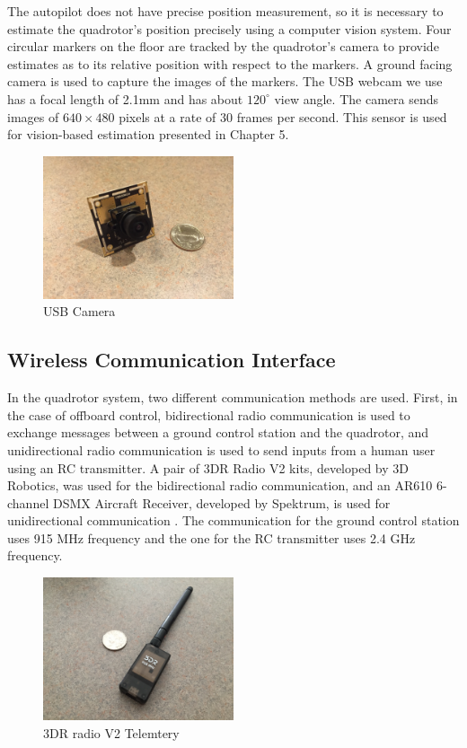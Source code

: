 The autopilot does not have precise position measurement, so it is necessary to estimate the quadrotor's position precisely using a computer vision system. Four circular markers on the floor are tracked by the quadrotor's camera to provide estimates as to its relative position with respect to the markers. A ground facing camera is used to capture the images of the markers. The USB webcam we use has a focal length of 2.1mm and has about \({120}^{\circ}\) view angle. The camera sends images of \(640 \times 480\) pixels at a rate of 30 frames per second. This sensor is used for vision-based estimation presented in Chapter 5.

\begin{figure}
    \centering
    \includegraphics[width=0.5\textwidth]{graphics/camera.jpg}
    \caption{USB Camera}
    \label{fig:camera}
\end{figure}

\subsection{Wireless Communication Interface}

In the quadrotor system, two different communication methods are used. First, in the case of offboard control, bidirectional radio communication is used to exchange messages between a ground control station and the quadrotor, and unidirectional radio communication is used to send inputs from a human user using an RC transmitter. A pair of 3DR Radio V2 kits, developed by 3D Robotics, was used for the bidirectional radio communication, and an AR610 6-channel DSMX Aircraft Receiver, developed by Spektrum, is used for unidirectional communication \cite{radio}\cite{spektrum}. The communication for the ground control station uses 915 MHz frequency and the one for the RC transmitter uses 2.4 GHz frequency.

\begin{figure}
    \centering
    \includegraphics[width=0.5\textwidth]{graphics/telemetry.jpg}
    \caption{3DR radio V2 Telemtery}
    \label{fig:telemetry}
\end{figure}

